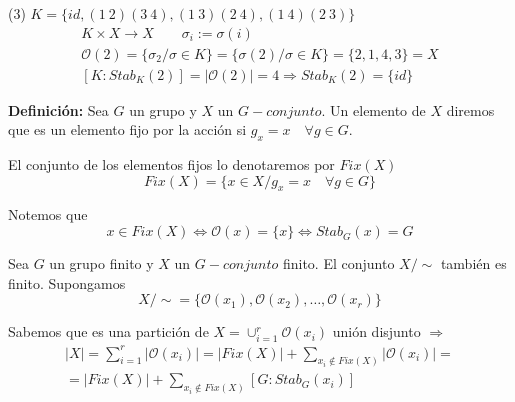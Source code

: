 \documentclass{article}
\begin{document}
(3) $K=\{id,(1\:2)(3\:4),(1\:3)(2\:4),(1\:4)(2\:3)\}$
\begin{gather*}
K\times X\longrightarrow X \qquad \sigma_i:=\sigma(i)\\
\mathcal{O}(2)=\{\sigma_2/\sigma \in K\}=\{\sigma(2)/\sigma\in K\}=\{2,1,4,3\}=X \\
\left[K:Stab_K(2)\right]=|\mathcal{O}(2)|=4\Rightarrow Stab_K(2)=\{id\}
\end{gather*}

\textbf{Definición:} Sea $G$ un grupo y $X$ un $G-conjunto$. Un elemento de $X$ diremos que es un elemento fijo por la acción si $g_x=x\quad \forall g\in G$. 

El conjunto de los elementos fijos lo denotaremos por $Fix(X)$ 
\begin{equation*}
Fix(X)=\{x\in X/g_x=x\quad \forall g\in G\}
\end{equation*}

Notemos que 
\begin{equation*}
x\in Fix(X)\Leftrightarrow \mathcal{O}(x)=\{x\}\Leftrightarrow Stab_G(x)=G
\end{equation*}

Sea $G$ un grupo finito y $X$ un $G-conjunto$ finito. El conjunto $X/\sim$ también es finito. Supongamos
\begin{equation*}
X/\sim=\{\mathcal{O}(x_1),\mathcal{O}(x_2),\ldots,\mathcal{O}(x_r)\}
\end{equation*}

Sabemos que es una partición de $X=\cup_{i=1}^r \mathcal{O}(x_i)$ unión disjunto $\Rightarrow$
\begin{gather*}
|X|=\sum_{i=1}^r |\mathcal{O}(x_i)|=|Fix(X)|+\sum_{x_i\notin Fix(X)}|\mathcal{O}(x_i)|= \\
=|Fix(X)|+\sum_{x_i\notin Fix(X)}\left[G:Stab_G(x_i)\right]
\end{gather*}
\end{document}
